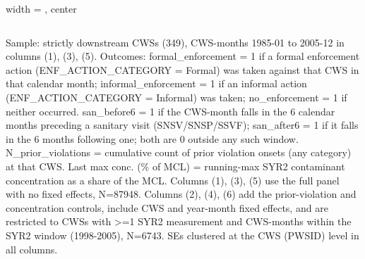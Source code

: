 \begin{table}[htbp]
\begin{adjustbox}{width = \textwidth, center}
\begin{tabular}{lcccccc}
         \bottomrule
         
      \end{tabular}
      
      
      
   \end{adjustbox}
      {\tiny\linespread{1}\selectfont \par \raggedright 
   Sample: strictly downstream CWSs (349), CWS-months 1985-01 to 2005-12 in columns (1), (3), (5). Outcomes: formal\_enforcement = 1 if a formal enforcement action (ENF\_ACTION\_CATEGORY = Formal) was taken against that CWS in that calendar month; informal\_enforcement = 1 if an informal action (ENF\_ACTION\_CATEGORY = Informal) was taken; no\_enforcement = 1 if neither occurred. san\_before6 = 1 if the CWS-month falls in the 6 calendar months preceding a sanitary visit (SNSV/SNSP/SSVF); san\_after6 = 1 if it falls in the 6 months following one; both are 0 outside any such window. N\_prior\_violations = cumulative count of prior violation onsets (any category) at that CWS. Last max conc. (\% of MCL) = running-max SYR2 contaminant concentration as a share of the MCL. Columns (1), (3), (5) use the full panel with no fixed effects, N=87948. Columns (2), (4), (6) add the prior-violation and concentration controls, include CWS and year-month fixed effects, and are restricted to CWSs with >=1 SYR2 measurement and CWS-months within the SYR2 window (1998-2005), N=6743. SEs clustered at the CWS (PWSID) level in all columns.}
   
\end{table}


